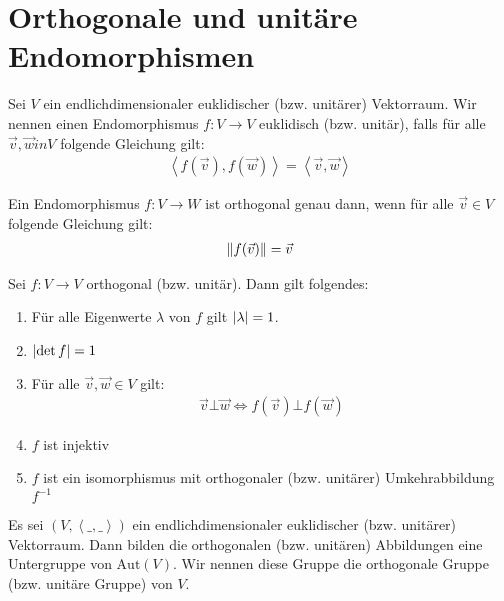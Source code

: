 \documentclass{report}
\newcommand{\vv}{\vec{v}}
\newcommand{\vw}{\vec{w}}
\newcommand{\scalar}[2]{\left\langle #1, #2 \right\rangle}
\begin{document}
\chapter{Orthogonale und unitäre Endomorphismen}
\begin{definition}
 Sei $V$ ein endlichdimensionaler euklidischer (bzw. unitärer) Vektorraum. Wir nennen einen Endomorphismus $f : V \to V$ euklidisch (bzw. unitär), falls für alle $\vv, \vw in V$ folgende Gleichung gilt:
 \begin{align*}
    \scalar{f(\vv)}{f(\vw)} = \scalar{\vv}{\vw}
 \end{align*}
 \end{definition}
 \begin{lemma}
  Ein Endomorphismus $f : V \to W$ ist orthogonal genau dann, wenn für alle $\vv \in V$ folgende Gleichung gilt:
  \begin{align*}
   \norm{f(\vv)} = \vv
  \end{align*}
 \end{lemma}
 \begin{theorem}
  Sei $f : V \to V$ orthogonal (bzw. unitär). Dann gilt folgendes:
  \begin{enumerate}
   \item Für alle Eigenwerte $\lambda$ von $f$ gilt $\abs{\lambda} = 1$.
   \item $\abs{\det f} = 1$
   \item Für alle $\vv, \vw \in V$ gilt:
   \begin{align*}
    \vv \bot \vw \Leftrightarrow f(\vv) \bot f(\vw)
   \end{align*}
   \item $f$ ist injektiv
   \item $f$ ist ein isomorphismus mit orthogonaler (bzw. unitärer) Umkehrabbildung $f^{-1}$
  \end{enumerate}
 \end{theorem}
 \begin{corollary}
  Es sei $(V, \scalar{\_}{\_})$ ein endlichdimensionaler euklidischer (bzw. unitärer) Vektorraum. Dann bilden die orthogonalen (bzw. unitären) Abbildungen eine Untergruppe von $\text{Aut}(V)$. Wir nennen diese Gruppe die orthogonale Gruppe (bzw. unitäre Gruppe) von $V$.
 \end{corollary}
\end{document}
